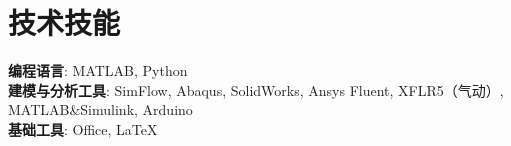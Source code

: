 \documentclass[letterpaper,11pt]{article}
\begin{document}
\section{技术技能}
 \begin{itemize}[leftmargin=0.15in, label={}]
    \small{\item{
     \textbf{编程语言}{: MATLAB, Python}\\
     \textbf{建模与分析工具}{: SimFlow, Abaqus, SolidWorks, Ansys Fluent, XFLR5（气动）, MATLAB\&Simulink, Arduino} \\
     \textbf{基础工具}{: Office, LaTeX} \\
    }}
 \end{itemize}
 \vspace{-16pt}
\end{document}
